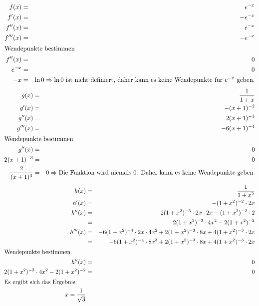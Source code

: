 \documentclass[10pt,a4paper,oneside,ngerman,numbers=noenddot]{scrartcl}
\begin{document}
\subsection{} %
\begin{alignat*}{2}
f(x) &=& e^{-x} \\
f'(x) &=& -e^{-x} \\
f''(x) &=& e^{-x} \\
f'''(x) &=& -e^{-x} \\
\intertext{Wendepunkte bestimmen}
f''(x) &=& 0 \\
e^{-x} &=& 0 \\
-x &=& \ln 0 \Rightarrow \text{$\ln 0$ ist nicht definiert, daher kann es keine Wendepunkte für $e^{-x}$ geben.}
\end{alignat*}
\begin{alignat*}{2}
g(x) &=& \frac{1}{1+x} \\
g'(x) &=& -(x+1)^{-2} \\
g''(x) &=& 2(x+1)^{-3} \\
g'''(x) &=& -6(x+1)^{-4} \\
\intertext{Wendepunkte bestimmen}
g''(x) &=& 0 \\
2(x+1)^{-3} &=& 0 \\
\frac{2}{(x+1)^{3}} &=& 0 \Rightarrow \text{Die Funktion wird niemals $0$. Daher kann es keine Wendepunkte geben.}
\end{alignat*}
\begin{alignat*}{2}
h(x) &=& \frac{1}{1+x^{2}} \\
h'(x) &=& -(1+x^{2})^{-2} \cdot 2x \\
h''(x) &=& 2(1+x^{2})^{-3} \cdot 2x \cdot 2x -(1+x^{2})^{-2} \cdot 2 \\
&=& 2(1+x^{2})^{-3} \cdot 4x^{2}  - 2(1+x^{2})^{-2} \\
h'''(x) &=& -6(1+x^{2})^{-4} \cdot 2x \cdot 4x^{2} + 2(1+x^{2})^{-3} \cdot 8x + 4(1+x^{2})^{-3} \cdot 2x \\
&=& -6(1+x^{2})^{-4} \cdot 8x^{3} + 2(1+x^{2})^{-3} \cdot 8x + 4(1+x^{2})^{-3} \cdot 2x \\
\intertext{Wendepunkte bestimmen}
h''(x) &=& 0 \\
2(1+x^{2})^{-3} \cdot 4x^{2}  - 2(1+x^{2})^{-2} &=& 0 \\
\intertext{Es ergibt sich das Ergebnis:}
x = \frac{1}{\sqrt{3}}
\end{alignat*}
\end{document}
